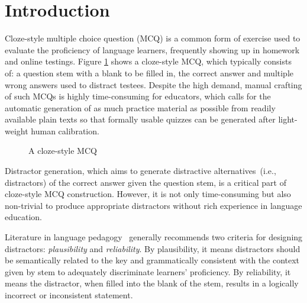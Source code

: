 \section{Introduction}
\label{sec:intro}
Cloze-style multiple choice question (MCQ) is a common form of exercise used to evaluate the proficiency of language learners, frequently showing up
in homework and online testings.
Figure \ref{fig:mcq} shows a cloze-style MCQ, which typically 
consists of: a question stem with a blank to be filled in, 
the correct answer and multiple wrong answers used to distract testees.
Despite the high demand, manual crafting of such MCQs is highly time-consuming 
for educators, which calls for the automatic generation of 
as much practice material as possible from readily available plain texts so that formally usable quizzes can be generated after light-weight human calibration.

\begin{figure}[!htb]
	\centering
	\caption{A cloze-style MCQ} \label{fig:mcq}
	\end{figure}

Distractor generation, which aims to generate distractive alternatives~(i.e., distractors) of the correct answer given the question stem, is a critical part of cloze-style MCQ construction. However, it is not only time-consuming but also non-trivial to produce appropriate distractors without rich experience in language education.

Literature in language pedagogy~\cite{haladyna2002review,pho2014multiple} generally recommends 
two criteria for designing distractors: 
{\em plausibility} and {\em reliability}. 
By plausibility, it means distractors should be semantically related to 
the key and grammatically consistent with the context given by stem 
to adequately discriminate learners' proficiency. 
By reliability, it means the distractor, when filled into the blank of
the stem, results in a logically incorrect or inconsistent statement.

